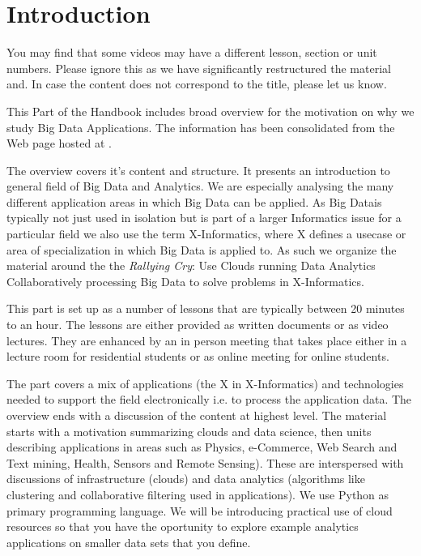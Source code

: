 

\section{Introduction}\label{introduction}

\FILENAME

\begin{IU}
  You may find that some videos may have a different lesson, section
  or unit numbers. Please ignore this as we have significantly
  restructured the material and. In case the content does not
  correspond to the title, please let us know.
\end{IU}

This Part of the Handbook includes broad overview for the motivation
on why we study Big Data Applications. The information has been
consolidated from the Web page hosted at .

The overview covers it's content and structure. It presents an
introduction to general field of Big Data and Analytics. We are
especially analysing the many different application areas in which Big
Data can be applied. As Big Datais typically not just used in isolation
but is part of a larger Informatics issue for a particular field we also
use the term X-Informatics, where X defines a usecase or area of
specialization in which Big Data is applied to. As such we organize the
material around the the \emph{Rallying Cry}: Use Clouds running
Data Analytics Collaboratively processing Big Data to solve problems in
X-Informatics.

This part is set up as a number of lessons that are typically between
20 minutes to an hour. The lessons are either provided as written
documents or as video lectures. They are enhanced by an in person
meeting that takes place either in a lecture room for residential
students or as online meeting for online students.

The part covers a mix of applications (the X in X-Informatics) and
technologies needed to support the field electronically i.e. to process
the application data. The overview ends with a discussion of the 
content at highest level. The material starts with a motivation
summarizing clouds and data science, then units describing applications
in areas such as Physics, e-Commerce, Web Search and Text mining,
Health, Sensors and Remote Sensing). These are interspersed with
discussions of infrastructure (clouds) and data analytics (algorithms
like clustering and collaborative filtering used in applications). We 
use Python as primary programming language. We will be
introducing practical use of cloud resources so that you have the
oportunity to explore example analytics applications on smaller data
sets that you define.

